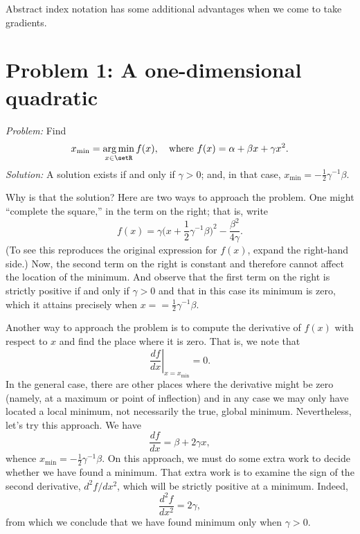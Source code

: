\documentclass[10pt, a4paper]{article}
\DeclareMathOperator*{\argmin}{arg\,min}
\begin{document}
Abstract index notation has some additional advantages when we come to
take gradients.

\section{Problem 1: A one-dimensional quadratic}

\emph{Problem:} Find
\begin{equation}
  x_\text{min} = \argmin_{x\in\setR} f(x), \quad\text{where $f(x) = \alpha + \beta x + \gamma x^2$}.
\label{problem-quadr-one-d}
\end{equation}
\emph{Solution:} A solution exists if and only if $\gamma>0$; and, in
that case, $x_\text{min} = -\frac{1}{2}\gamma^{-1}\beta$.

Why is that the solution? Here are two ways to approach the
problem. One might “complete the square,” in the term on the right;
that is, write
\begin{equation*}
  f(x) = \gamma\bigl(x + \frac{1}{2}\gamma^{-1}\beta\bigr)^2 - \frac{\beta^2}{4\gamma}. 
\end{equation*}
(To see this reproduces the original expression for $f(x)$, expand the
right-hand side.) Now, the second term on the right is constant and
therefore cannot affect the location of the minimum. And observe that
the first term on the right is strictly positive if and only if
$\gamma>0$ and that in this case its minimum is zero, which it attains
precisely when $x = =\frac{1}{2}\gamma^{-1}\beta$.

Another way to approach the problem is to compute the derivative of
$f(x)$ with respect to $x$ and find the place where it is zero. That
is, we note that
\begin{equation*}
  \left.\frac{df}{dx}\right|_{x = x_\text{min}} = 0.
\end{equation*}
In the general case, there are other places where the derivative might
be zero (namely, at a maximum or point of inflection) and in any case
we may only have located a local minimum, not necessarily the true,
global minimum. Nevertheless, let's try this approach. We have
\begin{equation*}
  \frac{df}{dx} = \beta + 2 \gamma x,
\end{equation*}
whence $x_\text{min} = -\frac{1}{2}\gamma^{-1}\beta$. On this approach, we must
do some extra work to decide whether we have found a minimum. That
extra work is to examine the sign of the second derivative, $d^2f/dx^2$,
which will be strictly positive at a minimum. Indeed,
\begin{equation*}
  \frac{d^2f}{dx^2} = 2\gamma,
\end{equation*}
from which we conclude that we have found minimum only when $\gamma> 0$.
\end{document}
